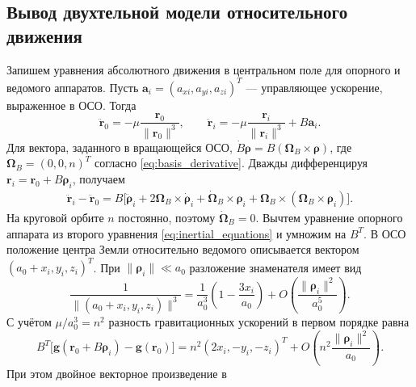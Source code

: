 \documentclass[a4paper,12pt]{article}
\begin{document}
\subsection{Вывод двухтельной модели относительного движения}

Запишем уравнения абсолютного движения в центральном поле для
опорного и ведомого аппаратов. Пусть
$\mathbf a_i=(a_{xi},a_{yi},a_{zi})^T$ --- управляющее ускорение,
выраженное в ОСО. Тогда
\begin{equation}
 \ddot{\mathbf r}_0=-\mu\frac{\mathbf r_0}{\|\mathbf r_0\|^3},
 \qquad
 \ddot{\mathbf r}_i=-\mu\frac{\mathbf r_i}{\|\mathbf r_i\|^3}
                        +B\mathbf a_i.
 \label{eq:inertial_equations}
\end{equation}
Для вектора, заданного в вращающейся ОСО,
$\dot B\boldsymbol\rho=B(\boldsymbol\Omega_B\times\boldsymbol\rho)$,
где $\boldsymbol\Omega_B=(0,0,n)^T$ согласно
\eqref{eq:basis_derivative}. Дважды дифференцируя
$\mathbf r_i=\mathbf r_0+B\boldsymbol\rho_i$, получаем
\begin{equation}
\begin{aligned}
 \ddot{\mathbf r}_i-\ddot{\mathbf r}_0=B\bigl[
 \ddot{\boldsymbol\rho}_i
 +2\boldsymbol\Omega_B\times\dot{\boldsymbol\rho}_i
 +\dot{\boldsymbol\Omega}_B\times\boldsymbol\rho_i
 +\boldsymbol\Omega_B\times
        (\boldsymbol\Omega_B\times\boldsymbol\rho_i)
 \bigr].
\end{aligned}
\label{eq:transport_acceleration}
\end{equation}
На круговой орбите $n$ постоянно, поэтому
$\dot{\boldsymbol\Omega}_B=0$. Вычтем уравнение опорного аппарата
из второго уравнения \eqref{eq:inertial_equations} и умножим на $B^T$.
В ОСО положение центра Земли относительно ведомого описывается
вектором $(a_0+x_i,y_i,z_i)^T$. При
$\|\boldsymbol\rho_i\|\ll a_0$ разложение знаменателя имеет вид
\begin{equation}
 \frac{1}{\|(a_0+x_i,y_i,z_i)\|^3}
 =\frac{1}{a_0^3}
       \left(1-\frac{3x_i}{a_0}\right)
  +O\!\left(\frac{\|\boldsymbol\rho_i\|^2}{a_0^5}\right).
 \label{eq:gravity_expansion}
\end{equation}
С учётом $\mu/a_0^3=n^2$ разность гравитационных ускорений
в первом порядке равна
\begin{equation}
 B^T\bigl[\mathbf g(\mathbf r_0+B\boldsymbol\rho_i)
                  -\mathbf g(\mathbf r_0)\bigr]
 =n^2(2x_i,-y_i,-z_i)^T
 +O\!\left(n^2\frac{\|\boldsymbol\rho_i\|^2}{a_0}\right).
 \label{eq:gravity_gradient}
\end{equation}
При этом двойное векторное произведение в
\end{document}
